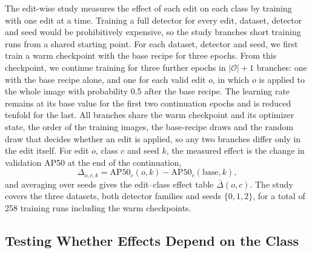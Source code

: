 The edit-wise study measures the effect of each edit on each class by training with one edit at a time. Training a full detector for every edit, dataset, detector and seed would be prohibitively expensive, so the study branches short training runs from a shared starting point. For each dataset, detector and seed, we first train a warm checkpoint with the base recipe for three epochs. From this checkpoint, we continue training for three further epochs in $|\mathcal{O}|+1$ branches: one with the base recipe alone, and one for each valid edit $o$, in which $o$ is applied to the whole image with probability 0.5 after the base recipe. The learning rate remains at its base value for the first two continuation epochs and is reduced tenfold for the last. All branches share the warm checkpoint and its optimizer state, the order of the training images, the base-recipe draws and the random draw that decides whether an edit is applied, so any two branches differ only in the edit itself. For edit $o$, class $c$ and seed $k$, the measured effect is the change in validation AP50 at the end of the continuation,
\begin{equation}
\Delta_{o,c,k}=\mathrm{AP50}_c(o,k)-\mathrm{AP50}_c(\mathrm{base},k),
\label{eq:delta}
\end{equation}
and averaging over seeds gives the edit--class effect table $\bar\Delta(o,c)$. The study covers the three datasets, both detector families and seeds $\{0,1,2\}$, for a total of 258 training runs including the warm checkpoints.

\subsection{Testing Whether Effects Depend on the Class}
\label{sec:measure_tests}

